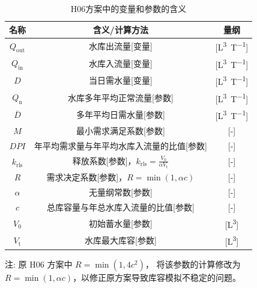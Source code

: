 \begin{table}[htbp]
    \centering
    \caption{H06方案中的变量和参数的含义}
    \label{tab:H06方案变量参数表}
    \begin{threeparttable}
    \begin{tabular}{ccc}
    \toprule
    名称 & 含义/计算方法 & 量纲 \\ \midrule
    $Q_{\mathrm{out}}$  & 水库出流量[变量]  &
    [\unit{L^3.T^{-1}}]  \\   $Q_{\mathrm{in}}$ & 水库入流量[变量] & [\unit{L^3.T^{-1}}] \\
    $D$ & 当日需水量[变量] & [\unit{L^3.T^{-1}}] \\
    $Q_{\mathrm {n}} $  &  水库多年平均正常流量[参数] & [\unit{L^3.T^{-1}}] \\
    $\overline{D}$ & 多年平均日需水量[参数] &[\unit{L^3.T^{-1}}] \\
    $M$  & 最小需求满足系数[参数] & [-]  \\
    $DPI$  & 年平均需求量与年平均水库入流量的比值[参数] & [-]  \\
    $k_{\mathrm{rls}}$ & 释放系数[参数]，$k_{\mathrm{rls}} = \frac{V_0}{\alpha V_{\mathrm {t}} }$ & [-]  \\
    $R$ & 需求决定系数[参数]，$R=\min(1, \alpha c)$ & [-]  \\
    $\alpha$ & 无量纲常数[参数] & [-]  \\
    $c$ & 总库容量与年总水库入流量的比值[参数] & [-]  \\
    $V_0$ & 初始蓄水量[参数] & [\unit{L^3}] \\
    $V_{\mathrm {t}} $ & 水库最大库容[参数] & [\unit{L^3}] \\
    \bottomrule
    \end{tabular}
    \begin{tablenotes}
    \footnotesize
    \item[注:] 原 H06 方案中 $R=\min(1,4 c^2)$，\citet{Shin-etal_19} 将该参数的计算修改为 $R=\min(1,\alpha c)$，以修正原方案导致库容模拟不稳定的问题。
    \end{tablenotes}
    \end{threeparttable}
\end{table}

